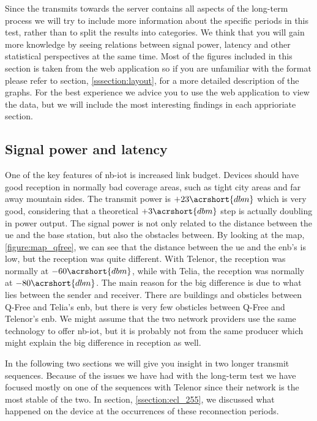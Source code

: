 \documentclass[USenglish]{ifimaster}  %
\begin{document}
Since the transmits towards the server contains all aspects of the long-term process we will try to include more information about the specific periods in this test, rather than to split the results into categories. We think that you will gain more knowledge by seeing relations between signal power, latency and other statistical perspectives at the same time. Most of the figures included in this section is taken from the web application so if you are unfamiliar with the format please refer to section, \vref{sssection:layout}, for a more detailed description of the graphs. For the best experience we advice you to use the web application to view the data, but we will include the most interesting findings in each apprioriate section.

\subsection{Signal power and latency}
One of the key features of \acrshort{nb-iot} is increased link budget. Devices should have good reception in normally bad coverage areas, such as tight city areas and far away mountain sides. The transmit power is ${+23 \acrshort{dbm}}$ which is very good, considering that a theoretical ${+3 \acrshort{dbm}}$ step is actually doubling in power output. The signal power is not only related to the distance between the \acrshort{ue} and the base station, but also the obstacles between. By looking at the map, \vref{figure:map_qfree}, we can see that the distance between the \acrshort{ue} and the \acrshort{enb}'s is low, but the reception was quite different. With Telenor, the reception was normally at ${-60 \acrshort{dbm}}$, while with Telia, the reception was normally at ${-80 \acrshort{dbm}}$.
The main reason for the big difference is due to what lies between the sender and receiver. There are buildings and obsticles between Q-Free and Telia's \acrshort{enb}, but there is very few obsticles between Q-Free and Telenor's \acrshort{enb}. We might assume that the two network providers use the same technology to offer \acrshort{nb-iot}, but it is probably not from the same producer which might explain the big difference in reception as well.

In the following two sections we will give you insight in two longer transmit sequences. Because of the issues we have had with the long-term test we have focused mostly on one of the sequences with Telenor since their network is the most stable of the two. In section, \vref{ssection:ecl_255}, we discussed what happened on the device at the occurrences of these reconnection periods.
\end{document}
